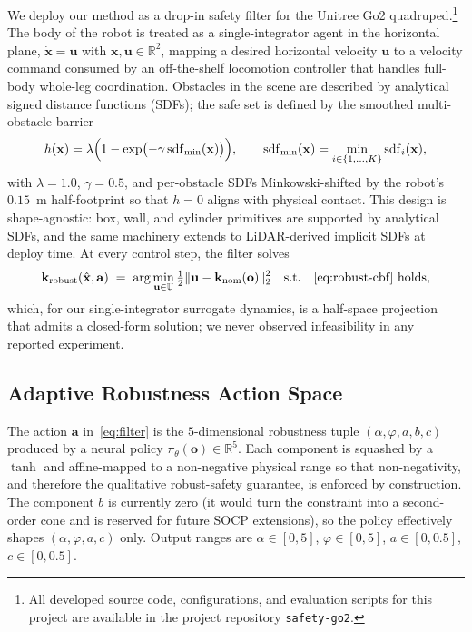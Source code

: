 \documentclass{article}
\newcommand{\R}{\mathbb{R}}
\newcommand{\bx}{\mathbf{x}}
\newcommand{\bu}{\mathbf{u}}
\newcommand{\bk}{\mathbf{k}}
\newcommand{\ba}{\mathbf{a}}
\newcommand{\bo}{\mathbf{o}}
\newcommand{\sdf}{\mathrm{sdf}}
\newcommand{\xhat}{\hat{\bx}}
\begin{document}
We deploy our method as a drop-in safety filter for the Unitree Go2
quadruped.\footnote{All developed source code, configurations, and evaluation
scripts for this project are available in the project repository
\texttt{safety-go2}.}
The body of the robot is treated as a single-integrator agent in the horizontal
plane,
$\dot{\bx} = \bu$ with $\bx,\bu\in\R^2$, mapping a desired horizontal velocity
$\bu$ to a velocity command consumed by an off-the-shelf locomotion controller
that handles full-body whole-leg coordination. Obstacles in the scene are
described by analytical signed distance functions (SDFs); the safe set is
defined by the smoothed multi-obstacle barrier
\begin{equation}
h(\bx) = \lambda\Bigl(1 - \exp\bigl(-\gamma\, \sdf_{\min}(\bx)\bigr)\Bigr),\qquad
\sdf_{\min}(\bx) = \min_{i\in\{1,\dots,K\}} \sdf_i(\bx),
\label{eq:h}
\end{equation}
with $\lambda=1.0$, $\gamma=0.5$, and per-obstacle SDFs Minkowski-shifted by
the robot's $0.15$~m half-footprint so that $h=0$ aligns with physical contact.
This design is shape-agnostic: box, wall, and cylinder primitives are
supported by analytical SDFs, and the same machinery extends to LiDAR-derived
implicit SDFs at deploy time. At every control step, the filter solves
\begin{equation}
\bk_\textup{robust}(\xhat,\ba) \;=\; \arg\min_{\bu\in\mathbb{U}} \tfrac{1}{2}\|\bu - \bk_\textup{nom}(\bo)\|_2^2
\quad\text{s.t.}\quad
\eqref{eq:robust-cbf}\text{ holds},
\label{eq:filter}
\end{equation}
which, for our single-integrator surrogate dynamics, is a half-space
projection that admits a closed-form solution; we never observed
infeasibility in any reported experiment.

\subsection{Adaptive Robustness Action Space}

The action $\ba$ in~\eqref{eq:filter} is the
$5$-dimensional robustness tuple $(\alpha,\varphi,a,b,c)$ produced by a
neural policy $\pi_\theta(\bo)\in\R^5$. Each component is squashed by a
$\tanh$ and affine-mapped to a non-negative physical range so that
non-negativity, and therefore the qualitative robust-safety guarantee, is
enforced by construction. The component $b$ is currently zero (it would
turn the constraint into a second-order cone and is reserved for future SOCP
extensions), so the policy effectively shapes
$(\alpha,\varphi,a,c)$ only. Output ranges are
$\alpha\in[0,5]$, $\varphi\in[0,5]$, $a\in[0,0.5]$, $c\in[0,0.5]$.
\end{document}
